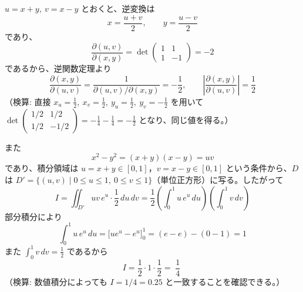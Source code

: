 
$u = x+y,\ v = x-y$ とおくと、逆変換は
\[
x = \frac{u+v}{2}, \qquad y = \frac{u-v}{2}
\]
であり、
\[
\frac{\partial(u,v)}{\partial(x,y)} = \det \begin{pmatrix} 1 & 1 \\ 1 & -1 \end{pmatrix} = -2
\]
であるから、逆関数定理より
\[
\frac{\partial(x,y)}{\partial(u,v)} = \frac{1}{\partial(u,v)/\partial(x,y)} = -\frac{1}{2}, \qquad
\left| \frac{\partial(x,y)}{\partial(u,v)} \right| = \frac{1}{2}
\]
（検算: 直接 $x_u = \tfrac12,\ x_v = \tfrac12,\ y_u = \tfrac12,\ y_v = -\tfrac12$ を用いて
$\det\begin{pmatrix}1/2 & 1/2 \\ 1/2 & -1/2\end{pmatrix} = -\tfrac14 - \tfrac14 = -\tfrac12$ となり、同じ値を得る。）

また
\[
x^{2} - y^{2} = (x+y)(x-y) = uv
\]
であり、積分領域は $u = x+y \in [0,1]$，$v = x-y \in [0,1]$ という条件から、$D$ は $D' = \{(u,v) \mid 0 \le u \le 1,\ 0 \le v \le 1\}$（単位正方形）に写る。したがって
\[
I = \iint_{D'} uv\, e^{u} \cdot \frac{1}{2}\, du\, dv
= \frac{1}{2} \left( \int_{0}^{1} u\, e^{u}\, du \right) \left( \int_{0}^{1} v\, dv \right)
\]
部分積分により
\[
\int_{0}^{1} u\, e^{u}\, du = \bigl[ u e^{u} - e^{u} \bigr]_{0}^{1} = (e - e) - (0 - 1) = 1
\]
また $\displaystyle \int_{0}^{1} v\, dv = \frac{1}{2}$ であるから
\[
I = \frac{1}{2} \cdot 1 \cdot \frac{1}{2} = \boxed{\; \frac{1}{4} \;}
\]
（検算: 数値積分によっても $I = 1/4 = 0.25$ と一致することを確認できる。）
